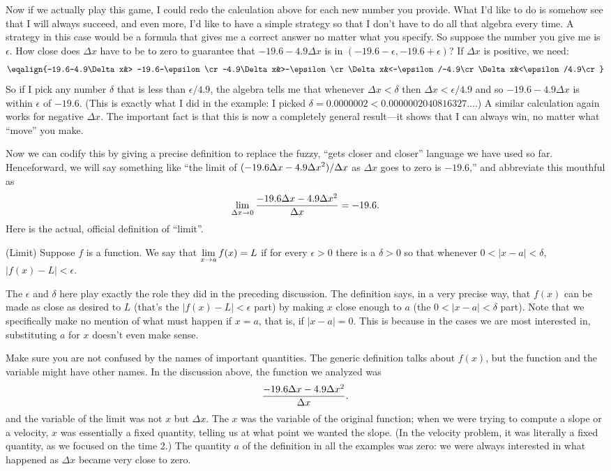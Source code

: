 Now if we actually play this game, I could redo the calculation above
for each new number you provide. What I'd like to do is somehow see
that I will always succeed, and even more, I'd like to have a simple
strategy so that I don't have to do all that algebra every time.
A strategy in this case would be a formula that gives me a correct
answer no matter what you specify. So suppose the number you give me
is $\epsilon$. How close does $\Delta x$ have to be to zero to
guarantee that $-19.6-4.9\Delta x$ is in $(-19.6-\epsilon,
-19.6+\epsilon)$? If $\Delta x$ is positive, we need:
$$\eqalign{-19.6-4.9\Delta x&> -19.6-\epsilon\cr
-4.9\Delta x&>-\epsilon\cr
\Delta x&<-\epsilon/-4.9\cr
\Delta x&<\epsilon/4.9\cr
}$$
So if I pick any number $\delta$ that is less than $\epsilon/4.9$, the
algebra tells me that whenever $\Delta x<\delta$ then 
$\Delta x<\epsilon/4.9$ and so $-19.6-4.9\Delta x$ is within
$\epsilon$ of $-19.6$. (This is exactly what I did in the example:
I picked $\delta = 0.0000002 < 0.0000002040816327\ldots$.)
A similar calculation again works for negative
$\Delta x$.
The important fact is that this is now a completely general result---it
shows that I can always win, no matter what ``move'' you make.

Now we can codify this by giving a precise definition to replace the
fuzzy, ``gets closer and closer'' language we have used so
far. Henceforward, we will say something like ``the limit of
$\displaystyle (-19.6\Delta x-4.9\Delta x^2)/\Delta x$ as $\Delta x$ goes to zero is
$-19.6$,'' and abbreviate this mouthful as
$$\lim_{\Delta x\to 0} {-19.6\Delta x-4.9\Delta x^2\over \Delta x}
= -19.6.
$$
Here is the actual, official definition of ``limit''.

 (Limit) Suppose $f$ is a function. We say that $\displaystyle \lim_{x\to
  a}f(x)=L$ if for every $\epsilon>0$ there is a $\delta > 0$ so that
  whenever $0 < |x-a| < \delta$, $|f(x)-L|<\epsilon$.
\enddef

The $\epsilon$ and $\delta$ here play exactly the role they did in the
preceding discussion. The definition says, in a very precise way, that
$f(x)$ can be made as close as desired to $L$ (that's the 
$|f(x)-L|<\epsilon$ part) by making $x$ close enough to $a$ (the 
$0 < |x-a| < \delta$ part). Note that we specifically make no mention
of what must happen if $x=a$, that is, if $|x-a|=0$. This is because
in the cases we are most interested in, substituting $a$ for $x$
doesn't even make sense.

Make sure you are not confused by the names of important
quantities. The generic definition talks about $f(x)$, but the
function and the variable might have other names. In the discussion
above, the function we analyzed was 
$${-19.6\Delta x-4.9\Delta x^2\over \Delta x}.
$$
and the variable of the limit was not $x$ but $\Delta x$. The $x$ was
the variable of the original function; when we were trying to compute
a slope or a velocity, $x$ was essentially a fixed quantity, telling us
at what point we wanted the slope. (In the velocity problem, it was
literally a fixed quantity, as we focused on the time 2.) The quantity
$a$ of the definition in all the examples was zero: we were always
interested in what happened as $\Delta x$ became very close to zero.

